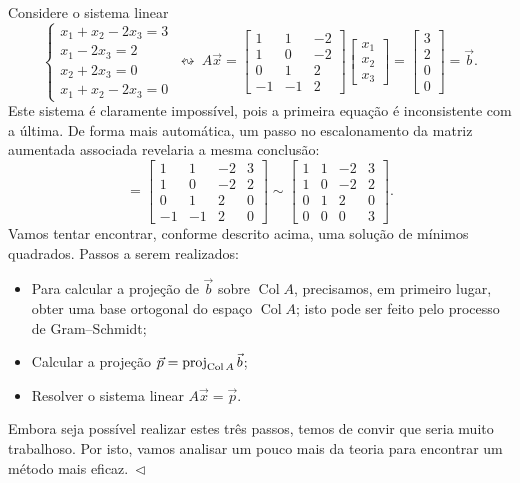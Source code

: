 \documentclass[../livro.tex]{subfiles}  %
\begin{document}
\begin{example}\label{exp:minquad1}
  Considere o sistema linear
  \begin{equation}
  \left\{
    \begin{array}{ll}
      x_1 + x_2 - 2x_3 = 3 \\
      x_1  - 2x_3 = 2 \\
      x_2 + 2x_3 = 0 \\
      x_1 + x_2 - 2x_3 = 0
    \end{array}
  \right. \ \leftrightsquigarrow  \
  A \vec{x} = \begin{bmatrix}
    1 & 1 & -2 \\ 1 & 0 & -2 \\ 0 & 1 & 2 \\ -1 & -1 & 2
  \end{bmatrix}
  \begin{bmatrix}
    x_1 \\ x_2 \\ x_3
  \end{bmatrix} =
  \begin{bmatrix}
    3 \\ 2 \\ 0 \\ 0
  \end{bmatrix} = \vec{b}.
  \end{equation} Este sistema é claramente impossível, pois a primeira equação é inconsistente com a última. De forma mais automática, um passo no escalonamento da matriz aumentada associada revelaria a mesma conclusão:
  \begin{equation}
  [\, A \ | \ \vec{b} \, ] = \begin{bmatrix}
    1 & 1 & -2 & 3 \\ 1 & 0 & -2 & 2 \\ 0 & 1 & 2 & 0 \\ -1 & -1 & 2 & 0
  \end{bmatrix}   \sim
  \begin{bmatrix}
    1 & 1 & -2 & 3 \\ 1 & 0 & -2 & 2 \\ 0 & 1 & 2 & 0 \\ 0 & 0 & 0 & 3
  \end{bmatrix} .
  \end{equation} Vamos tentar encontrar, conforme descrito acima, uma solução de mínimos quadrados. Passos a serem realizados:
  \begin{itemize}
  \item Para calcular a projeção de $\vec{b}$ sobre $\operatorname{Col} A$, precisamos, em primeiro lugar, obter uma base ortogonal do espaço $\operatorname{Col} A$; isto pode ser feito pelo processo de Gram--Schmidt;
  \item Calcular a projeção $\vec{p} = \operatorname{proj}_{\operatorname{Col} A} \vec{b}$;
  \item Resolver o sistema linear $A \vec{x} = \vec{p}$.
  \end{itemize} Embora seja possível realizar estes três passos, temos de convir que seria muito trabalhoso. Por isto, vamos analisar um pouco mais da teoria para encontrar um método mais eficaz$. \ \lhd$
\end{example}
\end{document}
